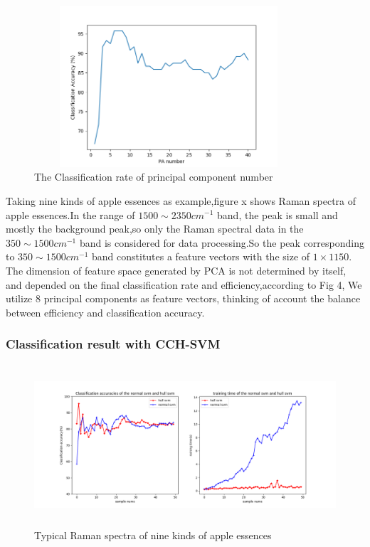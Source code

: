 \documentclass[a4paper]{article}
\begin{document}
    \begin{figure}[h]
  \centering
  \includegraphics[width=10cm,height=6cm]{Figure_3}
  \caption{ The Classification rate of principal component number }
\end{figure}
Taking nine kinds of apple essences as example,figure x shows Raman spectra of apple essences.In the range of $1500 \sim  2350 cm^{-1}$ band, the peak is small and mostly the background peak,so only the Raman spectral data in the $350 \sim 1500 cm^{-1}$ band is considered for data processing.So the peak corresponding to $ 350 \sim 1500 cm^{-1}$ band constitutes a feature vectors with the size of $ 1\times 1150 $.
The dimension of feature space generated by PCA is not determined by itself, and depended on the final classification rate and efficiency,according to Fig 4, We utilize 8 principal components as feature vectors, thinking of account the balance between efficiency and classification accuracy.

    \subsubsection{Classification result with CCH-SVM}

\begin{figure}[h]
  \centering
  \includegraphics[width=15cm,height=6cm]{Figure_2}
  \caption{Typical Raman spectra of nine kinds of apple essences}
\end{figure}
\end{document}
